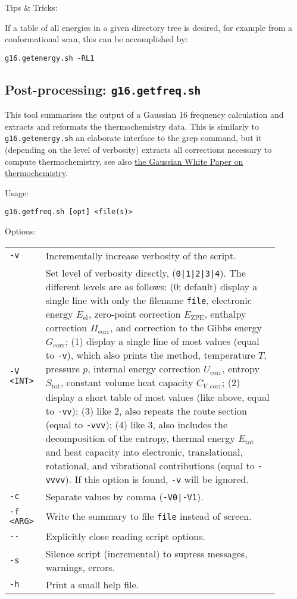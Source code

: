 \documentclass[   %
  final,          %
  a4paper         %
]{article}
\begin{document}
Tips \& Tricks:

If a table of all energies in a given directory tree is desired, 
for example from a conformational scan, this can be accomplished by:

\lstinline`g16.getenergy.sh -RL1`

\subsection{Post-processing: \texorpdfstring{{\lstinline`g16.getfreq.sh`}}{g16.getfreq.sh}}
\label{sec:g16.getfreq}

This tool summarises the output of a Gaussian 16 frequency calculation 
and extracts and reformats the thermochemistry data.
This is similarly to \lstinline`g16.getenergy.sh` an elaborate interface to the grep command,
but it (depending on the level of verbosity) extracts all corrections necessary 
to compute thermochemistry, see also 
\href{http://gaussian.com/thermo/}{the Gaussian White Paper on thermochemistry}.

Usage: 

\lstinline`g16.getfreq.sh [opt] <file(s)>`

Options:

\begin{tabular}{p{0.1\linewidth}p{0.8\linewidth}}
  {\lstinline`-v`}       & Incrementally increase verbosity of the script. \\
  {\lstinline`-V <INT>`} & Set level of verbosity directly, ({\lstinline`0|1|2|3|4`}).
    The different levels are as follows: %
    (0; default) display a single line with only the filename {\lstinline`file`}, 
        electronic energy \(E_\mathrm{el}\), zero-point correction \(E_\mathrm{ZPE}\),
        enthalpy correction \(H_\mathrm{corr}\), 
        and correction to the Gibbs energy \(G_\mathrm{corr}\);
    (1) display a single line of most values (equal to {\lstinline`-v`}), 
        which also prints the method, temperature \(T\), pressure \(p\), 
        internal energy correction \(U_\mathrm{corr}\),
        entropy  \(S_\mathrm{tot}\), constant volume heat capacity \(C_{V,\mathrm{corr}}\);
    (2) display a short table of most values (like above, equal to {\lstinline`-vv`});
    (3) like 2, also repeats the route section (equal to {\lstinline`-vvv`});
    (4) like 3, also includes the decomposition of the entropy, 
        thermal energy \(E_\mathrm{tot}\) and heat capacity into electronic, translational,
        rotational, and vibrational contributions (equal to {\lstinline`-vvvv`}).
    If this option is found, {\lstinline`-v`} will be ignored. \\
  {\lstinline`-c`}       & Separate values by comma ({\lstinline`-V0|-V1`}). \\
  {\lstinline`-f <ARG>`} & Write the summary to file {\lstinline`file`} instead of screen. \\
  {\lstinline`--`}       & Explicitly close reading script options. \\
  {\lstinline`-s`}       & Silence script (incremental) to supress messages, warnings, errors. \\
  {\lstinline`-h`}       & Print a small help file. \\
\end{tabular}
\end{document}
